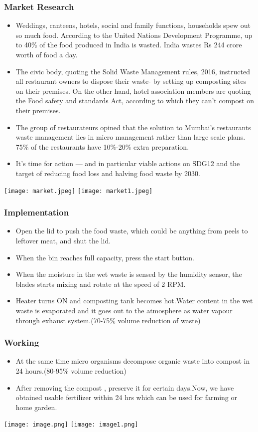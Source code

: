 \documentclass[11pt]{beamer}
\begin{document}
\begin{frame}
\frametitle{Market Research}
\begin{itemize}
	\item Weddings, canteens, hotels, social and family functions, households spew out so much food. According to the United Nations Development Programme, up to 40\% of the food produced in India is wasted. 
	India wastes Rs 244 crore worth of food a day.
	\item The civic body, quoting the Solid Waste Management rules, 2016, instructed all restaurant owners to dispose their waste- by setting up composting sites on their premises. On the other hand, hotel association members are quoting the Food safety and standards Act, according to which they can’t compost on their premises.
\end{itemize}	
\end{frame}
\begin{frame}
	\begin{itemize}
	\item The group of restaurateurs opined that the solution to Mumbai’s restaurants waste management lies in micro management rather than large scale plans. 75\% of the restaurants have 10\%-20\% extra preparation.
	\item It’s time for action — and in particular viable actions on SDG12 and the target of reducing food loss and halving food waste by 2030.
\end{itemize}
\texttt{[image: market.jpeg]}
\texttt{[image: market1.jpeg]}
	\end{frame}
\begin{frame}
\frametitle{Implementation}
\begin{itemize}
\item Open the lid to push the food waste, which could be anything from peels to leftover meat, and shut the lid.\item When the bin reaches full capacity, press the start button.\item When the moisture in the wet waste is sensed by the humidity sensor, the blades starts mixing and rotate at the speed of 2 RPM.\item Heater turns ON and composting tank becomes hot.Water content in the wet waste is evaporated and it goes out to the atmosphere as water vapour through exhaust system.(70-75\% volume reduction of waste)
\end{itemize}
\end{frame}
\begin{frame}
	\frametitle{Working}
	\begin{itemize}	
	\item At the same time micro organisms decompose organic waste into compost in 24 hours.(80-95\% volume reduction) \item After removing  the compost , preserve it for certain days.Now, we have obtained usable fertilizer within 24 hrs which can be used for farming or home garden.  
	\end{itemize}
 \texttt{[image: image.png]}
 \hfill
 \texttt{[image: image1.png]}
 \end{frame}
\end{document}
